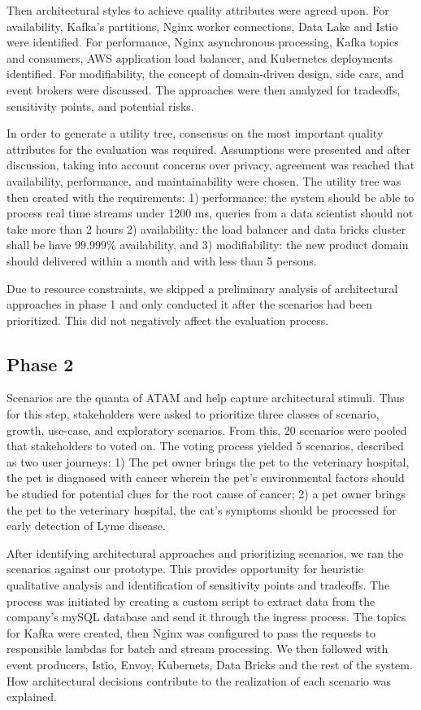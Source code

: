 \documentclass[a4paper,11pt]{article}
\begin{document}
Then architectural styles to achieve quality attributes were agreed upon. For availability, Kafka's partitions, Nginx worker connections, Data Lake and Istio were identified.  For performance, Nginx asynchronous processing, Kafka topics and consumers, AWS application load balancer, and Kubernetes deployments identified. For modifiability, the concept of domain-driven design, side cars, and event brokers were discussed. The approaches were then analyzed for tradeoffs, sensitivity points, and potential risks. 

In order to generate a utility tree, consensus on the most important quality attributes for the evaluation was required. Assumptions were presented and after discussion, taking into account concerns over privacy, agreement was reached that availability, performance, and maintainability were chosen. The utility tree was then created with the requirements: 1) performance: the system should be able to process real time streams under 1200 ms, queries from a data scientist should not take more than 2 hours 2) availability: the load balancer and data bricks cluster shall be have 99.999\% availability, and 3) modifiability: the new product domain should delivered within a month and with less than 5 persons.

Due to resource constraints, we skipped a preliminary analysis of architectural approaches in phase 1 and only conducted it after the scenarios had been prioritized. This did not negatively affect the evaluation process.



\subsection{Phase 2}
\nobreak{}
Scenarios are the quanta of ATAM and help capture architectural stimuli. Thus for this step, stakeholders were asked to prioritize three classes of scenario, growth, use-case, and exploratory scenarios. From this, 20 scenarios were pooled that stakeholders to voted on. The voting process yielded 5 scenarios, described as two user journeys: 1) The pet owner brings the pet to the veterinary hospital, the pet is diagnosed with cancer wherein the pet's environmental factors should be studied for potential clues for the root cause of cancer; 2) a pet owner brings the pet to the veterinary hospital, the cat's symptoms should be processed for early detection of Lyme disease. 

After identifying architectural approaches and prioritizing scenarios, we ran the scenarios against our prototype. This provides opportunity for heuristic qualitative analysis and identification of sensitivity points and tradeoffs. The process was initiated by creating a custom script to extract data from the company's mySQL database and send it through the ingress process. The topics for Kafka were created, then Nginx was configured to pass the requests to responsible lambdas for batch and stream processing. We then followed with event producers, Istio, Envoy, Kubernets, Data Bricks and the rest of the system. How architectural decisions contribute to the realization of each scenario was explained.
\end{document}

